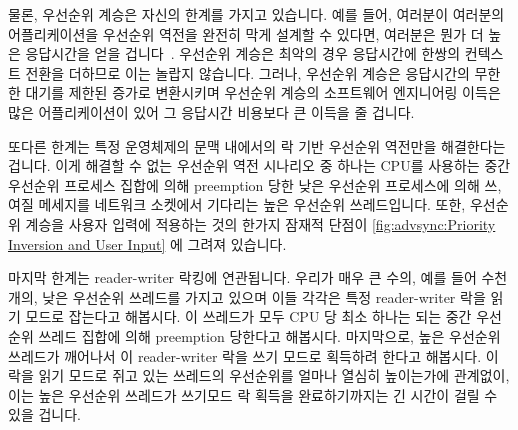 물론, 우선순위 계승은 자신의 한계를 가지고 있습니다.
예를 들어, 여러분이 여러분의 어플리케이션을 우선순위 역전을 완전히 막게 설계할
수 있다면, 여러분은 뭔가 더 높은 응답시간을 얻을
겁니다~\cite{VictorYodaiken2004a}.
우선순위 계승은 최악의 경우 응답시간에 한쌍의 컨텍스트 전환을 더하므로 이는
놀랍지 않습니다.
그러나, 우선순위 계승은 응답시간의 무한한 대기를 제한된 증가로 변환시키며
우선순위 계승의 소프트웨어 엔지니어링 이득은 많은 어플리케이션이 있어 그
응답시간 비용보다 큰 이득을 줄 겁니다.

또다른 한계는 특정 운영체제의 문맥 내에서의 락 기반 우선순위 역전만을
해결한다는 겁니다.
이게 해결할 수 없는 우선순위 역전 시나리오 중 하나는 CPU를 사용하는 중간
우선순위 프로세스 집합에 의해 preemption 당한 낮은 우선순위 프로세스에 의해
쓰,여질 메세지를 네트워크 소켓에서 기다리는 높은 우선순위 쓰레드입니다.
또한, 우선순위 계승을 사용자 입력에 적용하는 것의 한가지 잠재적 단점이
\cref{fig:advsync:Priority Inversion and User Input} 에 그려져 있습니다.

마지막 한계는 reader-writer 락킹에 연관됩니다.
우리가 매우 큰 수의, 예를 들어 수천개의, 낮은 우선순위 쓰레드를 가지고 있으며
이들 각각은 특정 reader-writer 락을 읽기 모드로 잡는다고 해봅시다.
이 쓰레드가 모두 CPU 당 최소 하나는 되는 중간 우선순위 쓰레드 집합에 의해
preemption 당한다고 해봅시다.
마지막으로, 높은 우선순위 쓰레드가 깨어나서 이 reader-writer 락을 쓰기 모드로
획득하려 한다고 해봅시다.
이 락을 읽기 모드로 쥐고 있는 쓰레드의 우선순위를 얼마나 열심히 높이는가에
관계없이, 이는 높은 우선순위 쓰레드가 쓰기모드 락 획득을 완료하기까지는 긴
시간이 걸릴 수 있을 겁니다.

